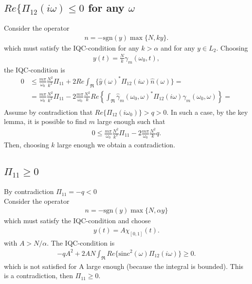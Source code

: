 \documentclass[a4paper,10pt]{article}
\newcommand{\w}{\omega}
\newcommand{\real}{Re}
\newcommand{\sgn}{\mathrm{sgn}}
\newcommand{\sinc}{\mathrm{sinc}}
\begin{document}
\subsection{$\real\{\Pi_{12}(i\w)\leq 0$ for any $\w$}
Consider the operator
\begin{align}
	n=-\sgn(y)\max\{N,ky\}.
\end{align}
which must satisfy the IQC-condition for any $k>\alpha$ and for any $y\in L_2$.
Choosing 
\begin{align}
	y(t)=\frac{N}{k}\gamma_m(\w_0,t),
\end{align} 
the IQC-condition is
\begin{align}
	0 &\leq \frac{m\pi}{\w_0}\frac{N^2}{k^2}\Pi_{11}+
		2\real\int_{\Re}\{\hat y(\w)^*\Pi_{12 }(i\w)\hat n(\w)\}= \\
	& = \frac{m\pi}{\w_0}\frac{N^2}{k^2}\Pi_{11}-
		2\frac{m\pi}{\w_0}\frac{N^2}{k}\real\left\{\int_{\Re}\hat \gamma_m(\w_0,\w)^*\Pi_{12 }(i\w)\hat \gamma_m(\w_0,\w)\right\} =\\
\end{align}
Assume by contradiction that $\real\{\Pi_{12}(i\w_0)\}>q>0$. In such a case, by the key lemma, it is possible
to find $m$ large enough such that
\begin{align}
	0 \leq \frac{m\pi}{\w_0}\frac{N^2}{k^2}\Pi_{11}-
		2\frac{m\pi}{\w_0}\frac{N^2}{k}q.
\end{align}
% 
Then, choosing $k$ large enough we obtain a contradiction.

\subsection{$\Pi_{11} \geq 0$}
By contradiction $\Pi_{11}=-q<0$\\
Consider the operator
\begin{align}
	n=-\sgn(y)\max\{N,\alpha y\}
\end{align}
which must satisfy the IQC-condition and choose
\begin{align}
	y(t)=A\chi_{[0,1]}(t).
\end{align}
with $A>N/\alpha$.
The IQC-condition is
\begin{align}
	-qA^2 +2AN\int_{\Re}\real\{\sinc^2(\w)\Pi_{12}(i\w)\}  \geq 0.
\end{align}
which is not satisfied for A large enough (because the integral is bounded). This is a contradiction, then $\Pi_{11}\geq 0$.
\end{document}
